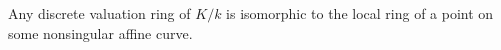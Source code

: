 Any discrete valuation ring of $K/k$ is isomorphic to the local ring of a point on some nonsingular affine curve.
